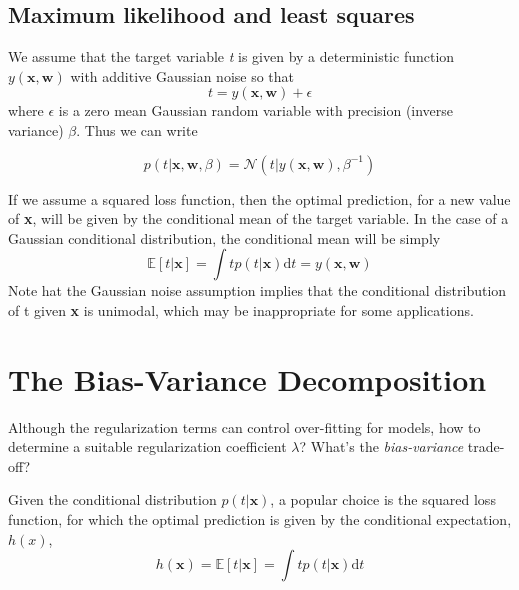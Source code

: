 \documentclass[5p,sort&compress]{elsarticle}
\begin{document}
\subsection{Maximum likelihood and least squares}

We assume that the target variable \textit{t} is given by a deterministic function $y(\mathbf{x},\mathbf{w})$ with additive Gaussian noise so that
\begin{equation}
t=y(\mathbf{x}, \mathbf{w})+\epsilon
\end{equation}
where $\epsilon$ is a zero mean Gaussian random variable with precision (inverse variance) $\beta$. Thus we can write

\begin{equation}
p(t | \mathbf{x}, \mathbf{w}, \beta)=\mathcal{N}\left(t | y(\mathbf{x}, \mathbf{w}), \beta^{-1}\right)
\end{equation}

If we assume a squared loss function, then the optimal prediction, for a new value of \textbf{x}, will be given by the conditional mean of the target variable. In the case of a Gaussian conditional distribution, the conditional mean will be simply
\begin{equation}
\mathbb{E}[t | \mathbf{x}]=\int t p(t | \mathbf{x}) \mathrm{d} t=y(\mathbf{x}, \mathbf{w})
\end{equation}
Note hat the Gaussian noise assumption implies that the conditional distribution of t given \textbf{x} is unimodal, which may be inappropriate for some applications.


\section{The Bias-Variance Decomposition}

Although  the regularization terms can control over-fitting for models, how to determine a suitable regularization coefficient $\lambda$? What's the \textit{bias-variance} trade-off?

Given the conditional distribution $p(t | \mathbf{x})$, a popular choice is the squared loss function, for which the optimal prediction is given by the conditional expectation, $h(x)$,
\begin{equation}
h(\mathbf{x})=\mathbb{E}[t | \mathbf{x}]=\int t p(t | \mathbf{x}) \mathrm{d} t
\end{equation}
\end{document}

